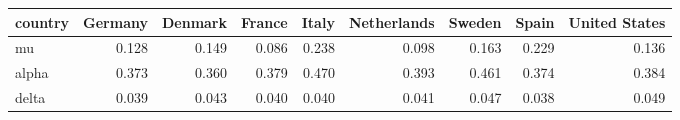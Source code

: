 \begin{tabular}{lrrrrrrrr}
\toprule
country &  Germany &  Denmark &  France &  Italy &  Netherlands &  Sweden &  Spain &  United States \\
\midrule
mu    &    0.128 &    0.149 &   0.086 &  0.238 &        0.098 &   0.163 &  0.229 &          0.136 \\
alpha &    0.373 &    0.360 &   0.379 &  0.470 &        0.393 &   0.461 &  0.374 &          0.384 \\
delta &    0.039 &    0.043 &   0.040 &  0.040 &        0.041 &   0.047 &  0.038 &          0.049 \\
\bottomrule
\end{tabular}
